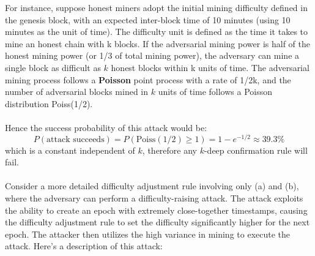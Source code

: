 For instance, suppose honest miners adopt the initial mining difficulty defined in the genesis block, with an expected inter-block time of 10 minutes (using 10 minutes as the unit of time). The difficulty unit is defined as the time it takes to mine an honest chain with k blocks. If the adversarial mining power is half of the honest mining power (or 1/3 of total mining power), the adversary can mine a single block as difficult as $k$ honest blocks within k units of time. The adversarial mining process follows a \textbf{Poisson} point process with a rate of 1/2k, and the number of adversarial blocks mined in $k$ units of time follows a Poisson distribution Poiss(1/2).\\\\
Hence the success probability of this attack would be:\\
\begin{equation*}
    P(\text{attack succeeds}) = P(\text{Poiss}(1/2) \geq 1) = 1 - e^{-1/2} \approx 39.3\%
\end{equation*}
which is a constant independent of $k$, therefore any $k$-deep confirmation rule will fail.\\\\
Consider a more detailed difficulty adjustment rule involving only (a) and (b), where the adversary can perform a difficulty-raising attack. The attack exploits the ability to create an epoch with extremely close-together timestamps, causing the difficulty adjustment rule to set the difficulty significantly higher for the next epoch. The attacker then utilizes the high variance in mining to execute the attack. Here's a description of this attack:
